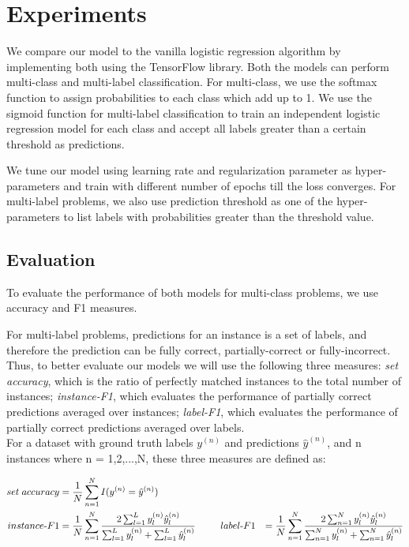 \section{Experiments}


We compare our model to the vanilla logistic regression algorithm by implementing both using the TensorFlow library. Both the models can perform multi-class and multi-label classification. For multi-class, we use the softmax function to assign probabilities to each class which add up to 1. We use the sigmoid function for multi-label classification to train an independent logistic regression model for each class and accept all labels greater than a certain threshold as predictions.

We tune our model using learning rate and regularization parameter as hyper-parameters and train with different number of epochs till the loss converges. For multi-label problems, we also use prediction threshold as one of the hyper-parameters to list labels with probabilities greater than the threshold value.

\subsection{Evaluation}

To evaluate the performance of both models for multi-class problems, we use accuracy and F1 measures.

For multi-label problems, predictions for an instance is a set of labels, and therefore the prediction can be fully correct, partially-correct or fully-incorrect. Thus, to better evaluate our models we will use the following three measures: \textit{set accuracy}, which is the ratio of perfectly matched instances to the total number of instances; \textit{instance-F1}, which evaluates the performance of partially correct predictions averaged over instances; \textit{label-F1}, which evaluates the performance of partially correct predictions averaged over labels.\\

For a dataset with ground truth labels $y^{(n)}$ and predictions $\hat{y}^{(n)}$, and n instances where n = 1,2,...,N, these three measures are defined as:

\begin{alignat}{2}
set\; accuracy & = \frac{1}{N} \sum_{n=1}^{N} {I(y^{(n)} = \hat{y}^{(n)})}\\
instance \mbox{-} F1 & = \frac{1}{N} \sum_{n=1}^{N} \frac{2\sum_{l=1}^{L} {y^{(n)}_{l} \hat{y}^{(n)}_{l}}}{\sum_{l=1}^{L} {y^{(n)}_{l}} + \sum_{l=1}^{L} {\hat{y}^{(n)}_{l}}}
\hspace{6ex}
label \mbox{-} F1 & = \frac{1}{N} \sum_{n=1}^{N} \frac{2\sum_{n=1}^{N} {y^{(n)}_{l} \hat{y}^{(n)}_{l}}}{\sum_{n=1}^{N} {y^{(n)}_{l}} + \sum_{n=1}^{N} {\hat{y}^{(n)}_{l}}}
\end{alignat}


